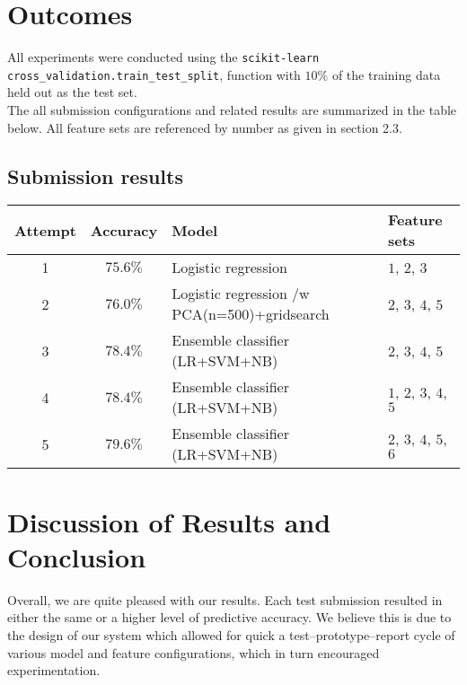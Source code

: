 \documentclass[
10pt, %
a4paper, %
oneside, %
headinclude,footinclude, %
BCOR5mm, %
]{scrartcl}
\begin{document}
\section{Outcomes}

All experiments were conducted using the \texttt{scikit-learn} 
\texttt{cross\_validation.train\_test\_split}, function with $10\%$ of
the training data held out as the test set. \\

\noindent The all submission configurations and related results are 
summarized in the table below. All feature sets are referenced by number as 
given in section 2.3.

\subsection{Submission results}
\begin{center}
    \begin{tabular}{| c | c | l | l|}
    \hline
    Attempt & Accuracy & Model               & Feature sets    \\ \hline
    1       & $75.6\%$ & Logistic regression  & $1$, $2$, $3$  \\ \hline
    2       & $76.0\%$ & Logistic regression /w PCA(n=500)+gridsearch &  $2$, $3$, $4$, $5$ \\ \hline
    3       & $78.4\%$ & Ensemble classifier (LR+SVM+NB) &$2$, $3$, $4$, $5$       \\ \hline
    4       & $78.4\%$ & Ensemble classifier (LR+SVM+NB) & $1$, $2$, $3$, $4$, $5$ \\ \hline
    5       & $79.6\%$ & Ensemble classifier (LR+SVM+NB) & $2$, $3$, $4$, $5$, $6$ \\ \hline
    \end{tabular}
\end{center}

\section{Discussion of Results and Conclusion}

Overall, we are quite pleased with our results. Each test submission resulted in
either the same or a higher level of predictive accuracy. We believe this is due
to the design of our system which allowed for quick a test--prototype--report
cycle of various model and feature configurations, which in turn encouraged
experimentation.
\end{document}
